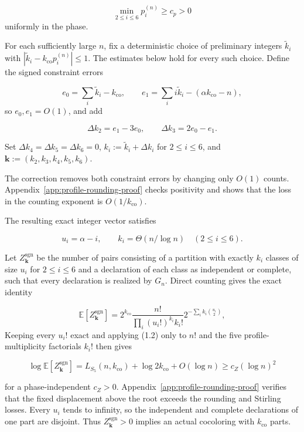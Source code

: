 \documentclass[a4paper,10pt,reqno]{amsart}
\numberwithin{equation}{section}
\newcommand{\Exp}[1]{\mathbb{E}\!\left[#1\right]}
\theoremstyle{plain}
\theoremstyle{remark}
\begin{document}
\[
 \min_{2\le i\le6}p_i^{(n)}\ge c_p>0                    \tag{5.15}
\]
uniformly in the phase.

For each sufficiently large $n$, fix a deterministic choice of preliminary integers
$\widetilde k_i$ with
$|\widetilde k_i-k_{\mathrm{co}}p_i^{(n)}|\le1$.
The estimates below hold for every such choice. Define the signed constraint errors

\[
 e_0=\sum_i\widetilde k_i-k_{\mathrm{co}},\qquad
 e_1=\sum_i i\widetilde k_i-(\alpha k_{\mathrm{co}}-n),
\]
so \(e_0,e_1=O(1)\), and add

\[
 \Delta k_2=e_1-3e_0,\qquad
 \Delta k_3=2e_0-e_1.                                   \tag{5.16}
\]

Set $\Delta k_4=\Delta k_5=\Delta k_6=0$, $k_i:=\widetilde k_i+\Delta k_i$ for
$2\le i\le6$, and $\mathbf k:=(k_2,k_3,k_4,k_5,k_6)$.

The correction removes both constraint errors by changing only \(O(1)\)
counts. Appendix~\ref{app:profile-rounding-proof} checks positivity and
shows that the loss in the counting exponent is \(O(1/k_{\mathrm{co}})\).

The resulting exact integer vector satisfies

\[
 u_i=\alpha-i,\qquad k_i=\Theta(n/{\log n})\quad(2\le i\le6).   \tag{5.17}
\]

Let $Z_{\mathbf k}^{\mathrm{sgn}}$ be the number of pairs consisting of a
partition with exactly $k_i$ classes of size $u_i$ for $2\le i\le6$ and a
declaration of each class as independent or complete, such that every
declaration is realized by $G_n$. Direct counting gives the exact identity

\[
 \Exp{Z_{\mathbf k}^{\mathrm{sgn}}}
 =2^{k_{\mathrm{co}}}\frac{n!}{\prod_i(u_i!)^{k_i}k_i!}
   2^{-\sum_i k_i\binom{u_i}{2}},                        \tag{5.18}
\]
Keeping every \(u_i!\) exact and applying (1.2) only to \(n!\) and the five
profile-multiplicity factorials \(k_i!\) then gives

\[
 \log \Exp{Z_{\mathbf k}^{\mathrm{sgn}}}
 =L_{S_5}(n,k_{\mathrm{co}})+{\log 2}k_{\mathrm{co}}+O({\log n})
 \ge c_Z(\log n)^2                                               \tag{5.19}
\]

for a phase-independent \(c_Z>0\). Appendix~\ref{app:profile-rounding-proof} verifies that the fixed
displacement above the root exceeds the rounding and Stirling losses. Every
\(u_i\) tends to infinity, so the independent and complete
declarations of one part are disjoint. Thus
\(Z_{\mathbf k}^{\mathrm{sgn}}>0\)
implies an actual cocoloring with \(k_{\mathrm{co}}\) parts.
\end{document}
